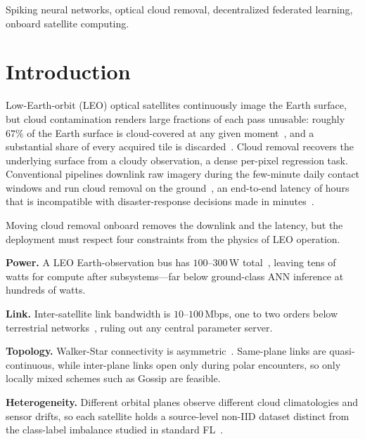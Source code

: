 \documentclass[conference]{IEEEtran}
\begin{document}
\begin{IEEEkeywords}
Spiking neural networks, optical cloud removal, decentralized
federated learning, onboard satellite computing.
\end{IEEEkeywords}

\section{Introduction}\label{sec:intro}

Low-Earth-orbit (LEO) optical satellites continuously image the
Earth surface, but cloud contamination renders large fractions of
each pass unusable: roughly $67\%$ of the Earth surface is
cloud-covered at any given
moment~\cite{ref:king2013cloud,ref:earthobs1}, and a substantial
share of every acquired tile is
discarded~\cite{ref:cuhkcr,ref:ebel2021multisensor}. Cloud removal
recovers the underlying surface from a cloudy observation, a dense
per-pixel regression task. Conventional pipelines downlink raw
imagery during the few-minute daily contact windows and run cloud
removal on the
ground~\cite{ref:earthobs1,ref:onboardfl-bottleneck}, an
end-to-end latency of hours that is incompatible with
disaster-response decisions made in
minutes~\cite{ref:earthobs2}.

Moving cloud removal onboard removes the downlink and the latency,
but the deployment must respect four constraints from the physics
of LEO operation.

\textbf{Power.} A LEO Earth-observation bus has $100$--$300$\,W
total~\cite{ref:spacecpn1}, leaving tens of watts for compute after
subsystems---far below ground-class ANN inference at hundreds of
watts.

\textbf{Link.} Inter-satellite link bandwidth is $10$--$100$\,Mbps,
one to two orders below terrestrial
networks~\cite{ref:spacecpn1,ref:onboardfl-bottleneck}, ruling out
any central parameter server.

\textbf{Topology.} Walker-Star connectivity is
asymmetric~\cite{ref:walker1984}. Same-plane links are
quasi-continuous, while inter-plane links open only during polar
encounters, so only locally mixed schemes such as Gossip are
feasible.

\textbf{Heterogeneity.} Different orbital planes observe different
cloud climatologies and sensor drifts, so each satellite holds a
source-level non-IID dataset distinct from the class-label
imbalance studied in standard FL~\cite{ref:hsu2019}.
\end{document}
